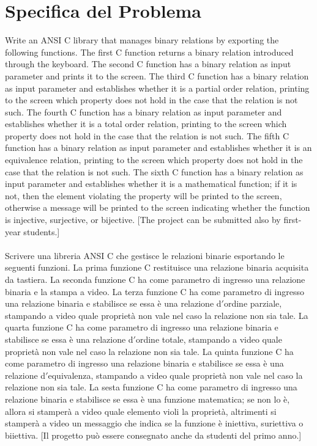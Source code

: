 \documentclass[11pt, a4paper, titlepage, block]{article}
\begin{document}
	\section{Specifica del Problema}
	Write an ANSI C library that manages binary relations by exporting the following functions. The ﬁrst C function returns a binary relation introduced through the keyboard. The second C function has a binary relation as input parameter and prints it to the screen. The third C function has a binary relation as input parameter and establishes whether it is a partial order relation, printing to the screen which property does not hold in the case that the relation is not such. The fourth C function has a binary relation as input parameter and establishes whether it is a total order relation, printing to the screen which property does not hold in the case that the relation is not such. The ﬁfth C function has a binary relation as input parameter and establishes whether it is an equivalence relation, printing to the screen which property does not hold in the case that the relation is not such. The sixth C function has a binary relation as input parameter and establishes whether it is a mathematical function; if it is not, then the element violating the property will be printed to the screen, otherwise a message will be printed to the screen indicating whether the function is injective, surjective, or bijective.
	[The project can be submitted also by ﬁrst-year students.]\\
	\\
	Scrivere una libreria ANSI C che gestisce le relazioni binarie esportando le seguenti funzioni. La prima funzione C restituisce una relazione binaria acquisita da tastiera. La seconda funzione C ha come parametro di ingresso una relazione binaria e la stampa a video. La terza funzione C ha come parametro di ingresso una relazione binaria e stabilisce se essa \`e una relazione d$'$ordine parziale, stampando a video quale propriet\`a non vale nel caso la relazione non sia tale. La quarta funzione C ha come parametro di ingresso una relazione binaria e stabilisce se essa \`e una relazione d$'$ordine totale, stampando a video quale propriet\`a non vale nel caso la relazione non sia tale. La quinta funzione C ha come parametro di ingresso una relazione binaria e stabilisce se essa \`e una relazione d$'$equivalenza, stampando a video quale propriet\`a non vale nel caso la relazione non sia tale. La sesta funzione C ha come parametro di ingresso una relazione binaria e stabilisce se essa \`e una funzione matematica; se non lo \`e, allora si stamper\`a a video quale elemento violi la propriet\`a, altrimenti si stamper\`a a video un messaggio che indica se la funzione \`e iniettiva, suriettiva o biiettiva.
	[Il progetto pu\`o essere consegnato anche da studenti del primo anno.]\\
	\newpage
\end{document}
